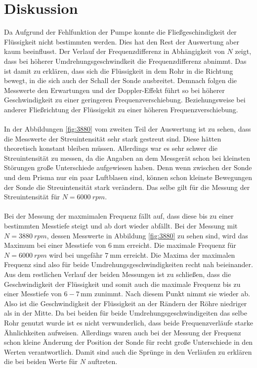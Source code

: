 \section{Diskussion}
\label{sec:Diskussion}

Da Aufgrund der Fehlfunktion der Pumpe konnte die Fließgeschindigkeit der Flüssigkeit nicht bestimmten werden.
Dies hat den Rest der Auswertung aber kaum beeinflusst.
Der Verlauf der Frequenzdifferenz in Abhängigkeit von $N$ zeigt, dass bei höherer Umdrehungsgeschwindkeit die Frequenzdifferenz abnimmt.
Das ist damit zu erklären, dass sich die Flüssigkeit in dem Rohr in die Richtung bewegt, in die sich auch der Schall der Sonde ausbreitet.
Demnach folgen die Messwerte den Erwartungen und der Doppler-Effekt führt so bei höherer Geschwindigkeit zu einer geringeren Frequenzverschiebung.
Beziehungsweise bei anderer Fließrichtung der Flüssigekit zu einer höheren Frequenzverschiebung.
\\\\
In der Abbildungen \ref{fig:3880} vom zweiten Teil der Auswertung ist zu sehen, dass die Messwerte der Streuintensität sehr stark gestreut sind.
Diese hätten theoretisch konstant bleiben müssen.
Allerdings war es sehr schwer die Streuintensität zu messen, da die Angaben an dem Messgerät schon bei kleinsten Störungen große Unterschiede aufgewiesen haben.
Denn wenn zwischen der Sonde und dem Prisma nur ein paar Luftblasen sind, können schon kleinste Bewegungen der Sonde die Streuintensität stark verändern.
Das selbe gilt für die Messung der Streuintensität für $N=\SI{6000}{rpm}$.
\\\\
Bei der Messung der maxmimalen Frequenz fällt auf, dass diese bis zu einer bestimmten Messtiefe steigt und ab dort wieder abfällt.
Bei der Messung mit $N=\SI{3880}{rpm}$, dessen Messwerte in Abbildung \ref{fig:3880} zu sehen sind, wird das Maximum bei einer Messtiefe von $\SI{6}{\milli\meter}$ erreicht.
Die maximale Frequenz für $N=\SI{6000}{rpm}$ wird bei ungefähr $\SI{7}{\milli\meter}$ erreicht.
Die Maxima der maximalen Frequenz sind also für beide Umdrehungsgeschwindigkeiten recht nah beieinander.
Aus dem restlichen Verlauf der beiden Messungen ist zu schließen, dass die Geschwindigkeit der Flüssigkeit und somit auch die maximale Frequenz bis zu einer Messtiefe von $6-7 \,\si{\milli\meter}$ zunimmt.
Nach diesem Punkt nimmt sie wieder ab.
Also ist die Geschwindigkeit der Flüssigkeit an der Rändern der Röhre niedriger als in der Mitte.
Da bei beiden für beide Umdrehungsgeschwindigeiten das selbe Rohr genutzt wurde ist es nicht verwunderlich, dass beide Frequenzverläufe starke Ähnlichkeiten aufweisen.
Allerdings waren auch bei der Messung der Frequenz schon kleine Änderung der Position der Sonde für recht große Unterschiede in den Werten verantwortlich.
Damit sind auch die Sprünge in den Verläufen zu erklären die bei beiden Werte für $N$ auftreten.
